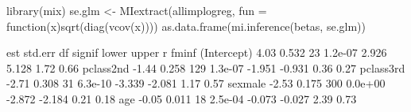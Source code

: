\begin{Schunk}
\begin{Sinput}
 library(mix)
 se.glm <- MIextract(allimplogreg, fun = function(x){sqrt(diag(vcov(x)))}) 
 as.data.frame(mi.inference(betas, se.glm))
\end{Sinput}
\begin{Soutput}
              est std.err  df  signif  lower  upper    r fminf
(Intercept)  4.03   0.532  23 1.2e-07  2.926  5.128 1.72  0.66
pclass2nd   -1.44   0.258 129 1.3e-07 -1.951 -0.931 0.36  0.27
pclass3rd   -2.71   0.308  31 6.3e-10 -3.339 -2.081 1.17  0.57
sexmale     -2.53   0.175 300 0.0e+00 -2.872 -2.184 0.21  0.18
age         -0.05   0.011  18 2.5e-04 -0.073 -0.027 2.39  0.73
\end{Soutput}
\end{Schunk}
